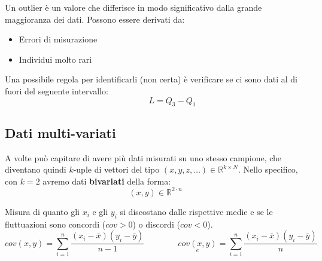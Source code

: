 \begin{center}
\end{center}

\begin{definition}[Outlier]
	Un outlier è un valore che differisce in modo significativo dalla grande maggioranza dei dati. Possono essere derivati da:
	\begin{itemize}
		\item Errori di misurazione
		\item Individui molto rari
	\end{itemize}
	Una possibile regola per identificarli (non certa) è verificare se ci sono dati al di fuori del seguente intervallo:
	\begin{equation*}
		[Q_1-1.5 \cdot L, Q_3+1.5 \cdot L] \qquad\qquad L=Q_3-Q_1
	\end{equation*}
\end{definition}

\subsection{Dati multi-variati}
A volte può capitare di avere più dati misurati su uno stesso campione, che diventano quindi $k$-uple di vettori del tipo $(x,y,z,\ldots) \in \mathbb{R}^{k \times N}$. Nello specifico, con $k=2$ avremo dati \textbf{bivariati} della forma:
\begin{equation*}
	(x,y) \in \mathbb{R}^{2 \cdot n}
\end{equation*}

\begin{definition}
	Misura di quanto gli $x_i$ e gli $y_i$ si discostano dalle rispettive medie e se le fluttuazioni sono concordi ($cov>0$) o discordi ($cov<0$).
	\begin{equation}
		cov(x,y) = \sum_{i=1}^{n} \frac{(x_i - \bar{x})(y_i - \bar{y})}{n-1} \qquad\qquad \underset{e}{cov(x,y)} = \sum_{i=1}^{n} \frac{(x_i - \bar{x})(y_i - \bar{y})}{n}
	\end{equation}
\end{definition}

